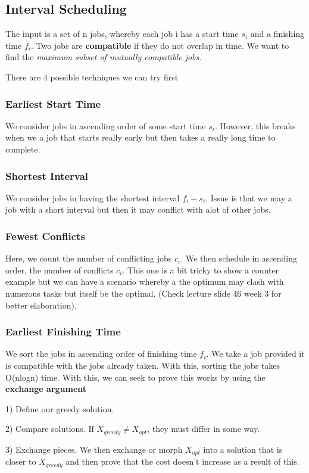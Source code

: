 \documentclass[11pt, oneside]{article}
\theoremstyle{definition}
\begin{document}
\subsection{Interval Scheduling}
The input is a set of n jobs, whereby each job i has a start time $s_i$ and a finishing time $f_i$. Two jobs are \textbf{compatible} if they do not overlap in time. We want to find the \textit{maximum subset of mutually compatible jobs}.

There are 4 possible techniques we can try first
\subsubsection{Earliest Start Time}
We consider jobs in ascending order of some start time $s_i$. However, this breaks when we a job that starts really early but then takes a really long time to complete.

\subsubsection{Shortest Interval}
We consider jobs in having the shortest interval $f_i - s_i$. Issue is that we may a job with a short interval but then it may conflict with alot of other jobs.

\subsubsection{Fewest Conflicts}
Here, we count the number of conflicting jobs $c_i$. We then schedule in ascending order, the number of conflicts $c_i$. This one is a bit tricky to show a counter example but we can have a scenario whereby a the optimum may clash with numerous tasks but itself be the optimal. (Check lecture slide 46 week 3 for better elaboration).

\subsubsection{Earliest Finishing Time}
We sort the jobs in ascending order of finishing time $f_i$. We take a job provided it is compatible with the jobs already taken. With this, sorting the jobs takes O(nlogn) time. With this, we can seek to prove this works by using the \textbf{exchange argument}

1) Define our greedy solution.

2) Compare solutions. If $X_{greedy} \neq X_{opt}$, they must differ in some way.

3) Exchange pieces. We then exchange or morph $X_{opt}$ into a solution that is closer to $X_{greedy}$ and then prove that the cost doesn't increase as a result of this.
\end{document}
